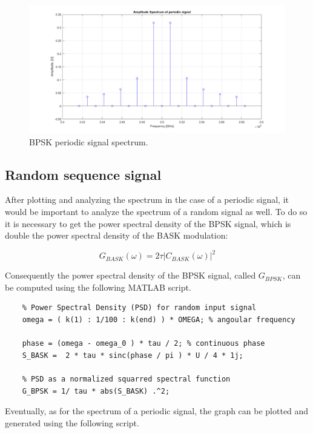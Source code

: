 \begin{figure}[h]
    \centering
    \includegraphics[width = \textwidth]{../res/imgs/periodic-signal-spectrum.png}
    \caption{BPSK periodic signal spectrum.}
    \label{fig:periodic-signal-spectrum}
\end{figure}


\subsection{Random sequence signal}
After plotting and analyzing the spectrum in the case of a periodic signal, it would be important to analyze the spectrum of a random signal as well. To do so it is necessary to get the power spectral density of the BPSK signal, which is double the power spectral density of the BASK modulation:

\begin{equation*}
    G_{BASK}(\omega) = 2\tau|C_{BASK}(\omega)|^2
\end{equation*}

\noindent Consequently the power spectral density of the BPSK signal, called $G_{BPSK}$, can be computed using the following MATLAB script.

\begin{lstlisting}
    % Power Spectral Density (PSD) for random input signal
    omega = ( k(1) : 1/100 : k(end) ) * OMEGA; % angoular frequency 

    phase = (omega - omega_0 ) * tau / 2; % continuous phase 
    S_BASK =  2 * tau * sinc(phase / pi ) * U / 4 * 1j;

    % PSD as a normalized squarred spectral function
    G_BPSK = 1/ tau * abs(S_BASK) .^2;
\end{lstlisting}

\noindent Eventually, as for the spectrum of a periodic signal, the graph can be plotted and generated using the following script.

